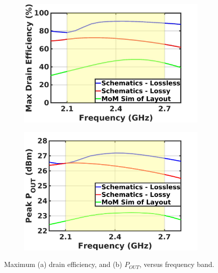 \documentclass[conference]{IEEEtran}
\begin{document}
\begin{figure}[!t]
\captionsetup{font=footnotesize}
\centering
\begin{subfigure}{0.24\textwidth}
\centering
\includegraphics[width=1\textwidth]{Images/Output_Network_Comp/Comp_DE_loss_layout.jpg}
\caption{}
\label{fig:Comp_DE_loss_layout}
\end{subfigure}
\begin{subfigure}{0.24\textwidth}
\includegraphics[width=1\textwidth]{Images/Output_Network_Comp/Comp_Pout_loss_layout.jpg}
\caption{}
\label{fig:Comp_Pout_loss_layout}
\end{subfigure}
\caption{Maximum  (a) drain efficiency, and (b) $P_{OUT}$, versus frequency band.}
\label{fig:Comp_Pout_DE}
\vspace{-0.1in}
\end{figure}
\end{document}
